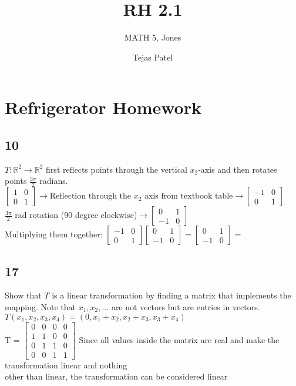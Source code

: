 \documentclass{article}
\title{RH 2.1}
\author{MATH 5, Jones}
\date{Tejas Patel}
\begin{document}
\maketitle
\section*{Refrigerator Homework}
\subsection*{10}
 \( T: \mathbb{R}^2 \to \mathbb{R}^2 \) first reflects points through the vertical \( x_2 \)-axis and then rotates points \( \frac{3\pi}{2} \) radians.
\\$\begin{bmatrix}
  1&0\\0&1
\end{bmatrix} \rightarrow \text{Reflection through the $x_2$ axis from textbook table} \rightarrow \begin{bmatrix}
  -1&0\\0&1
\end{bmatrix}$
\\[0.1in]$\frac{3\pi}{2}$ rad rotation (90 degree clockwise)$\rightarrow \begin{bmatrix}
  0&1\\-1&0
\end{bmatrix}$
\\[0.1in]Multiplying them together: 
$\begin{bmatrix}-1&0\\0&1\end{bmatrix} \begin{bmatrix}0&1\\-1&0\end{bmatrix}= 
\begin{bmatrix}0&1\\-1&0\end{bmatrix}=$
\subsection*{17}
Show that \( T \) is a linear transformation by finding a matrix that implements the mapping. Note that \( x_1, x_2, \dots \) are not vectors but are entries in vectors.
\\\( T(x_1, x_2, x_3, x_4) = (0, x_1 + x_2, x_2 + x_3, x_3 + x_4) \)
\\T = $\begin{bmatrix}
  0 & 0 & 0 & 0 \\
  1 & 1 & 0 & 0 \\
  0 & 1 & 1 & 0 \\
  0 & 0 & 1 & 1
  \end{bmatrix}$ Since all values inside the matrix are real and make the transformation linear and nothing \\[0.05in]other than linear, the transformation can be considered linear
\end{document}
